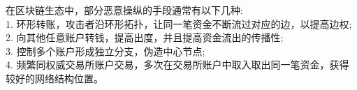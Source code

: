 在区块链生态中，部分恶意操纵的手段通常有以下几种:\\
1. 环形转账，攻击者沿环形拓扑，让同一笔资金不断流过对应的边，以提高边权;\\
2. 向其他任意账户转钱，提高出度，并且提高资金流出的传播性;\\
3. 控制多个账户形成独立分支，伪造中心节点;\\
4. 频繁同权威交易所账户交易，多次在交易所账户中取入取出同一笔资金，获得较好的网络结构位置。\\




